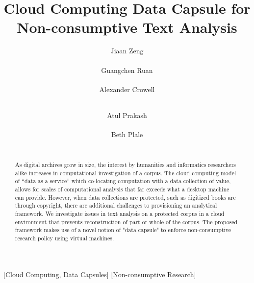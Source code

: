 \documentclass{acm_proc_article-sp}
\begin{document}
\title{Cloud Computing Data Capsule for Non-consumptive Text Analysis}

\author{
\alignauthor
Jiaan Zeng \\
       \\
\alignauthor
Guangchen Ruan \\
       \\
\alignauthor 
Alexander Crowell \\
       \\
\and  %
\alignauthor 
Atul Prakash \\
       \\
\alignauthor Beth Plale \\
       \\
}

\maketitle
\begin{abstract}
As digital archives grow in size, the interest by humanities and informatics
researchers alike increases in computational investigation of a corpus.  The
cloud computing model of ``data as a service'' which co-locating computation with
a data collection of value, allows for scales of computational analysis that
far exceeds what a desktop machine can provide. However, when data collections
are protected, such as digitized books are through copyright, there are
additional challenges to provisioning an analytical framework. We investigate
issues in text analysis on a protected corpus in a cloud environment that
prevents reconstruction of part or whole of the corpus.  The proposed framework
makes use of a novel notion of "data capsule" to enforce non-consumptive
research policy using virtual machines.
\end{abstract}


[Cloud Computing, Data Capsules]
[Non-consumptive Research]
\end{document}
